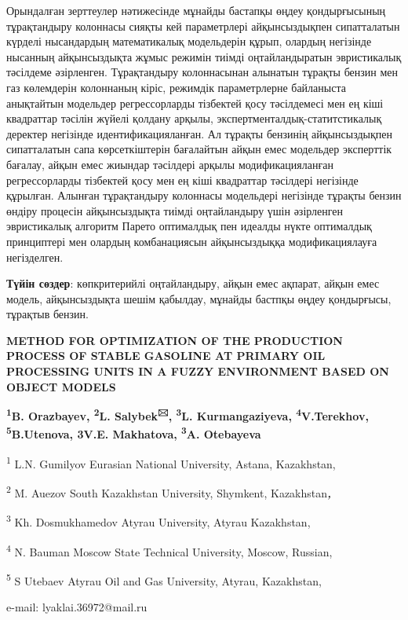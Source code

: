 Орындалған зерттеулер нәтижесінде мұнайды бастапқы өңдеу қондырғысының
тұрақтандыру колоннасы сияқты кей параметрлері айқынсыздықпен
сипатталатын күрделі нысандардың математикалық модельдерін құрып,
олардың негізінде нысанның айқынсыздықта жұмыс режимін тиімді
оңтайландыратын эвристикалық тәсілдеме әзірленген. Тұрақтандыру
колоннасынан алынатын тұрақты бензин мен газ көлемдерін колоннаның
кіріс, режимдік параметрлерне байланыста анықтайтын модельдер
регрессорларды тізбектей қосу тәсілдемесі мен ең кіші квадраттар тәсілін
жүйелі қолдану арқылы, экспертменталдық-статитстикалық деректер
негізінде идентификацияланған. Ал тұрақты бензинің айқынсыздықпен
сипатталатын сапа көрсеткіштерін бағалайтын айқын емес модельдер
эксперттік бағалау, айқын емес жиындар тәсілдері арқылы
модификацияланған регрессорларды тізбектей қосу мен ең кіші квадраттар
тәсілдері негізінде құрылған. Алынған тұрақтандыру колоннасы модельдері
негізінде тұрақты бензин өндіру процесін айқынсыздықта тиімді
оңтайландыру үшін әзірленген эвристикалық алгоритм Парето оптималдық пен
идеалды нүкте оптималдық принциптері мен олардың комбанациясын
айқынсыздыққа модификациялауға негізделген.

{\bfseries Түйін сөздер}: көпкритерийлі оңтайландыру, айқын емес ақпарат,
айқын емес модель, айқынсыздықта шешім қабылдау, мұнайды бастпқы өңдеу
қондырғысы, тұрақтыв бензин.

\begin{center}
{\bfseries METHOD FOR OPTIMIZATION OF THE PRODUCTION PROCESS OF STABLE GASOLINE AT PRIMARY OIL PROCESSING UNITS IN A FUZZY ENVIRONMENT BASED ON OBJECT MODELS}

{\bfseries \textsuperscript{1}B. Orazbayev, \textsuperscript{2}L.
Salybek\textsuperscript{🖂}, \textsuperscript{3}L. Kurmangaziyeva,
\textsuperscript{4}V.Terekhov, \textsuperscript{5}B.Utenova, {3}V.E. Makhatova, \textsuperscript{3}A.
Otebayeva}

\textsuperscript{1} L.N. Gumilyov Eurasian National University, Astana,
Kazakhstan,

\textsuperscript{2} M. Auezov South Kazakhstan University, Shymkent,
Kazakhstan\emph{{\bfseries ,}}

\textsuperscript{3} Kh. Dosmukhamedov Atyrau University, Atyrau
Kazakhstan,

\textsuperscript{4} N. Bauman Moscow State Technical University, Moscow,
Russian,

\textsuperscript{5} S Utebaev Atyrau Oil and Gas University, Atyrau,
Kazakhstan,

e-mail: lyaklai.36972@mail.ru
\end{center}

